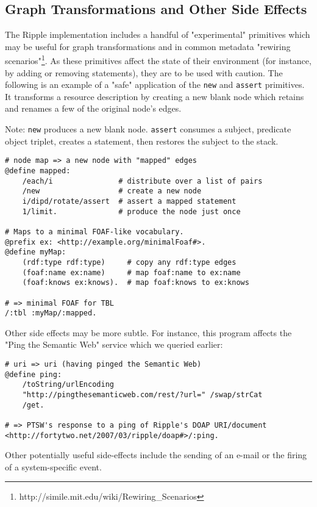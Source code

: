 \documentclass[runningheads]{llncs}
\begin{document}
\subsection{Graph Transformations and Other Side Effects}
The Ripple implementation includes a handful of "experimental" primitives which may be useful for graph transformations and in common metadata "rewiring scenarios"\footnote{http://simile.mit.edu/wiki/Rewiring\_Scenarios}.  As these primitives affect the state of their environment (for instance, by adding or removing statements), they are to be used with caution.  The following is an example of a "safe" application of the \texttt{new} and \texttt{assert} primitives.  It transforms a resource description by creating a new blank node which retains and renames a few of the original node's edges.

Note: \texttt{new} produces a new blank node.  \texttt{assert} consumes a subject, predicate object triplet, creates a statement, then restores the subject to the stack.
\begin{verbatim}
# node map => a new node with "mapped" edges
@define mapped:
    /each/i               # distribute over a list of pairs
    /new                  # create a new node
    i/dipd/rotate/assert  # assert a mapped statement
    1/limit.              # produce the node just once

# Maps to a minimal FOAF-like vocabulary.
@prefix ex: <http://example.org/minimalFoaf#>.
@define myMap:
    (rdf:type rdf:type)     # copy any rdf:type edges
    (foaf:name ex:name)     # map foaf:name to ex:name
    (foaf:knows ex:knows).  # map foaf:knows to ex:knows

# => minimal FOAF for TBL
/:tbl :myMap/:mapped.
\end{verbatim}

Other side effects may be more subtle.  For instance, this program affects the "Ping the Semantic Web" service which we queried earlier:
\begin{verbatim}
# uri => uri (having pinged the Semantic Web)
@define ping:
    /toString/urlEncoding
    "http://pingthesemanticweb.com/rest/?url=" /swap/strCat
    /get.

# => PTSW's response to a ping of Ripple's DOAP URI/document
<http://fortytwo.net/2007/03/ripple/doap#>/:ping.
\end{verbatim}

Other potentially useful side-effects include the sending of an e-mail or the firing of a system-specific event.
\end{document}
